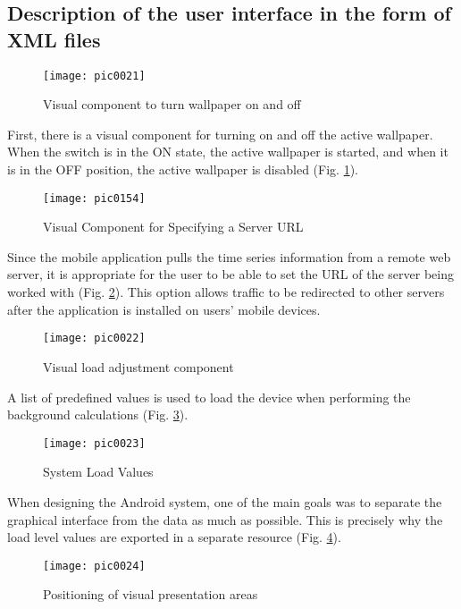 \subsection{Description of the user interface in the form of XML files}

\begin{figure}[h]
\centering
\texttt{[image: pic0021]}
\caption{Visual component to turn wallpaper on and off}
\label{fig:pic0021}
\end{figure}
\FloatBarrier

First, there is a visual component for turning on and off the active wallpaper. When the switch is in the ON state, the active wallpaper is started, and when it is in the OFF position, the active wallpaper is disabled (Fig. \ref{fig:pic0021}).

\begin{figure}[h]
\centering
\texttt{[image: pic0154]}
\caption{Visual Component for Specifying a Server URL}
\label{fig:pic0154}
\end{figure}
\FloatBarrier

Since the mobile application pulls the time series information from a remote web server, it is appropriate for the user to be able to set the URL of the server being worked with (Fig. \ref{fig:pic0154}). This option allows traffic to be redirected to other servers after the application is installed on users' mobile devices.

\begin{figure}[h]
\centering
\texttt{[image: pic0022]}
\caption{Visual load adjustment component}
\label{fig:pic0022}
\end{figure}
\FloatBarrier

A list of predefined values is used to load the device when performing the background calculations (Fig. \ref{fig:pic0022}).

\begin{figure}[h]
\centering
\texttt{[image: pic0023]}
\caption{System Load Values}
\label{fig:pic0023}
\end{figure}
\FloatBarrier

When designing the Android system, one of the main goals was to separate the graphical interface from the data as much as possible. This is precisely why the load level values are exported in a separate resource (Fig. \ref{fig:pic0023}).

\begin{figure}[h]
\centering
\texttt{[image: pic0024]}
\caption{Positioning of visual presentation areas}
\label{fig:pic0024}
\end{figure}
\FloatBarrier

